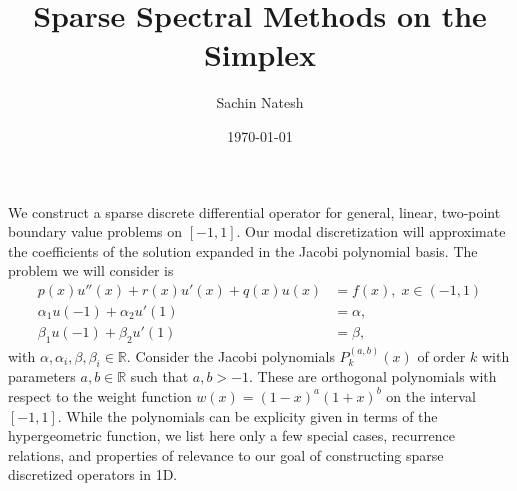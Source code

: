  


\newcommand{\bs}{\boldsymbol}
\renewcommand{\st}{\text{ s.t. }}
\newcommand{\eps}{\varepsilon}
\newcommand{\s}{\;}
\newcommand{\sif}{\text{ if }}
\newcommand{\pfrac}{\displaystyle \frac}
\newcommand{\Tau}{\mathcal{T}}
\newcommand{\Tref}{\mathcal{T}_{\text{ref}}}
\newcommand{\Qref}{\mathcal{Q}_{\text{ref}}}
\newcommand{\bb}[1]{\mathbb{#1}}

\newtheorem{theorem}{Theorem}[section]
\newtheorem{corollary}{Corollary}[theorem]
\newtheorem{lemma}{Lemma}[section]
\newtheorem{definition}{Definition}[section]
\newtheorem{proposition}{Proposition}[section]
\newtheorem{corollaryprop}{Corollary}[proposition]

\title{Sparse Spectral Methods on the Simplex}
\author{Sachin Natesh}
\date{\today}


	\setcounter{secnumdepth}{5}
	\setcounter{tocdepth}{4}
\maketitle
\tableofcontents
\newpage


We construct a sparse discrete differential operator for general, linear, two-point boundary value problems on $[-1,1]$. Our modal discretization will approximate the coefficients of the solution expanded in the Jacobi polynomial basis. The problem we will consider is
\begin{align}\label{eq:prob}
p(x)u''(x) + r(x)u'(x) + q(x)u(x) &= f(x),\s x \in (-1,1)\\
\alpha_1u(-1) + \alpha_2u'(1) &=\alpha,\label{eq:probbc0}\\ \beta_1u(-1)+\beta_2u'(1) &= \beta,\label{eq:probbc}
\end{align}
with $\alpha,\alpha_i,\beta,\beta_i\in \bb{R}.$
Consider the Jacobi polynomials $P_k^{(a,b)}(x)$ of order $k$ with parameters $a,b \in \bb{R}$ such that $a,b> -1$. These are orthogonal polynomials with respect to the weight function $w(x)=(1-x)^a(1+x)^b$ on the interval $[-1,1]$. While the polynomials can be explicity given in terms of the hypergeometric function, we list here only a few special cases, recurrence relations, and properties of relevance to our goal of constructing sparse discretized operators in 1D. 

